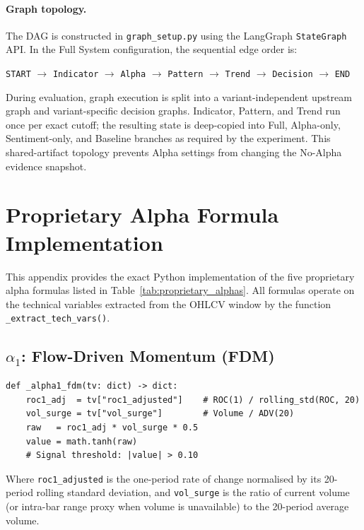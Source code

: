 \paragraph{Graph topology.}
The DAG is constructed in \texttt{graph\_setup.py} using the LangGraph \texttt{StateGraph} API. In the Full System configuration, the sequential edge order is:
\begin{center}
\texttt{START} $\rightarrow$ \texttt{Indicator} $\rightarrow$ \texttt{Alpha} $\rightarrow$ \texttt{Pattern} $\rightarrow$ \texttt{Trend} $\rightarrow$ \texttt{Decision} $\rightarrow$ \texttt{END}
\end{center}
During evaluation, graph execution is split into a variant-independent upstream graph and variant-specific decision graphs. Indicator, Pattern, and Trend run once per exact cutoff; the resulting state is deep-copied into Full, Alpha-only, Sentiment-only, and Baseline branches as required by the experiment. This shared-artifact topology prevents Alpha settings from changing the No-Alpha evidence snapshot.


\section{Proprietary Alpha Formula Implementation}
\label{app:alpha_impl}

This appendix provides the exact Python implementation of the five proprietary alpha formulas listed in Table~\ref{tab:proprietary_alphas}. All formulas operate on the technical variables extracted from the OHLCV window by the function \texttt{\_extract\_tech\_vars()}.

\subsection{$\alpha_1$: Flow-Driven Momentum (FDM)}

\begin{small}
\begin{verbatim}
def _alpha1_fdm(tv: dict) -> dict:
    roc1_adj  = tv["roc1_adjusted"]    # ROC(1) / rolling_std(ROC, 20)
    vol_surge = tv["vol_surge"]        # Volume / ADV(20)
    raw   = roc1_adj * vol_surge * 0.5
    value = math.tanh(raw)
    # Signal threshold: |value| > 0.10
\end{verbatim}
\end{small}

Where \texttt{roc1\_adjusted} is the one-period rate of change normalised by its 20-period rolling standard deviation, and \texttt{vol\_surge} is the ratio of current volume (or intra-bar range proxy when volume is unavailable) to the 20-period average volume.

